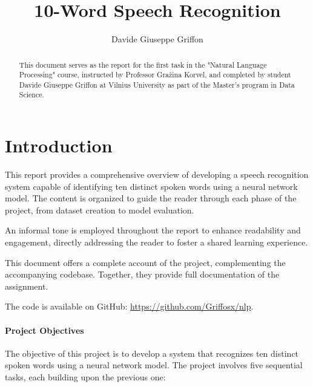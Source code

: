 \documentclass[12pt]{article}
\title{10-Word Speech Recognition}
\author{Davide Giuseppe Griffon}
\date{}
\begin{document}
\maketitle

\begin{abstract}
    This document serves as the report for the first task in the "Natural Language Processing" course, instructed by Professor Gražina Korvel, and completed by student Davide Giuseppe Griffon at Vilnius University as part of the Master's program in Data Science.
\end{abstract}

\tableofcontents

\newpage

\section{Introduction}

This report provides a comprehensive overview of developing a speech recognition system capable of identifying ten distinct spoken words using a neural network model. The content is organized to guide the reader through each phase of the project, from dataset creation to model evaluation.

An informal tone is employed throughout the report to enhance readability and engagement, directly addressing the reader to foster a shared learning experience.

This document offers a complete account of the project, complementing the accompanying codebase. Together, they provide full documentation of the assignment.

The code is available on GitHub: \href{https://github.com/Griffosx/nlp}{https://github.com/Griffosx/nlp}.

\paragraph{Project Objectives}

The objective of this project is to develop a system that recognizes ten distinct spoken words using a neural network model. The project involves five sequential tasks, each building upon the previous one:
\end{document}
